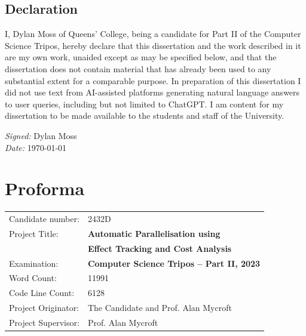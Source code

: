 \documentclass[12pt,a4paper,twoside,openright]{report}
\begin{document}
\section*{Declaration}

I, Dylan Moss of Queens' College, being a candidate for Part II of the Computer Science Tripos, hereby declare that this dissertation and the work described in it are my own work, unaided except as may be specified below, and that the dissertation does not contain material that has already been used to any substantial extent for a comparable purpose. In preparation of this dissertation I did not use text from AI-assisted platforms generating natural language answers to user queries, including but not limited to ChatGPT. I am content for my dissertation to be made available to the students and staff of the University.

\emph{Signed:} Dylan Moss\\
\emph{Date:} \today

\chapter*{Proforma}
 {\large
  \begin{tabular}{ll}
	  Candidate number:   & 2432D                                        \\
	  Project Title:      & \bf Automatic Parallelisation using          \\ & \bf Effect Tracking and Cost Analysis \\
	  Examination:        & \bf Computer Science Tripos -- Part II, 2023 \\
	  Word Count:         & 11991\footnotemark[1]                        \\
	  Code Line Count:    & 6128\footnotemark[2]                         \\
	  Project Originator: & The Candidate and Prof. Alan Mycroft         \\
	  Project Supervisor: & Prof. Alan Mycroft                           \\
  \end{tabular}
 }
\end{document}
